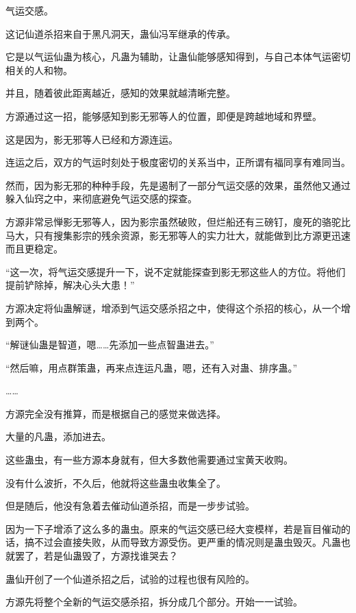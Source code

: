 
\begin{this_body}

气运交感。

这记仙道杀招来自于黑凡洞天，蛊仙冯军继承的传承。

它是以气运仙蛊为核心，凡蛊为辅助，让蛊仙能够感知得到，与自己本体气运密切相关的人和物。

并且，随着彼此距离越近，感知的效果就越清晰完整。

方源通过这一招，能够感知到影无邪等人的位置，即便是跨越地域和界壁。

这是因为，影无邪等人已经和方源连运。

连运之后，双方的气运时刻处于极度密切的关系当中，正所谓有福同享有难同当。

然而，因为影无邪的种种手段，先是遏制了一部分气运交感的效果，虽然他又通过躲入仙窍之中，来彻底避免气运交感的探查。

方源非常忌惮影无邪等人，因为影宗虽然破败，但烂船还有三磅钉，廋死的骆驼比马大，只有搜集影宗的残余资源，影无邪等人的实力壮大，就能做到比方源更迅速而且更稳定。

“这一次，将气运交感提升一下，说不定就能探查到影无邪这些人的方位。将他们提前铲除掉，解决心头大患！”

方源决定将仙蛊解谜，增添到气运交感杀招之中，使得这个杀招的核心，从一个增到两个。

“解谜仙蛊是智道，嗯……先添加一些点智蛊进去。”

“然后嘛，用点群策蛊，再来点连运凡蛊，嗯，还有入对蛊、排序蛊。”

……

方源完全没有推算，而是根据自己的感觉来做选择。

大量的凡蛊，添加进去。

这些蛊虫，有一些方源本身就有，但大多数他需要通过宝黄天收购。

没有什么波折，不久后，他就将这些蛊虫收集全了。

但是随后，他没有急着去催动仙道杀招，而是一步步试验。

因为一下子增添了这么多的蛊虫。原来的气运交感已经大变模样，若是盲目催动的话，搞不过会直接失败，从而导致方源受伤。更严重的情况则是蛊虫毁灭。凡蛊也就罢了，若是仙蛊毁了，方源找谁哭去？

蛊仙开创了一个仙道杀招之后，试验的过程也很有风险的。

方源先将整个全新的气运交感杀招，拆分成几个部分。开始一一试验。


\end{this_body}
